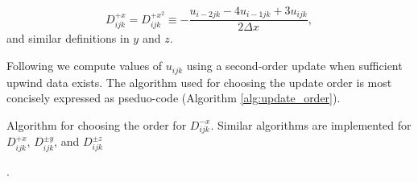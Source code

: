 		\begin{equation}
			D^{+x}_{ijk} = D^{+x^2}_{ijk} \equiv -\frac{u_{i-2jk}-4u_{i-1jk}+3u_{ijk}}{2\Delta x},
		\end{equation}
		and similar definitions in $y$ and $z$.
		
		Following  we compute values of $u_{ijk}$ using a second-order update when sufficient upwind data exists. The algorithm used for choosing the update order is most concisely expressed as pseduo-code (Algorithm \ref{alg:update_order}).
		
		\begin{algorithm}
			\SetAlgoLined
			\caption{Algorithm for choosing the order for $D^{-x}_{ijk}$. Similar algorithms are implemented for $D^{+x}_{ijk}$, $D^{\pm y}_{ijk}$, and $D^{\pm z}_{ijk}$}.
			\label{alg:update_order}
		\end{algorithm}